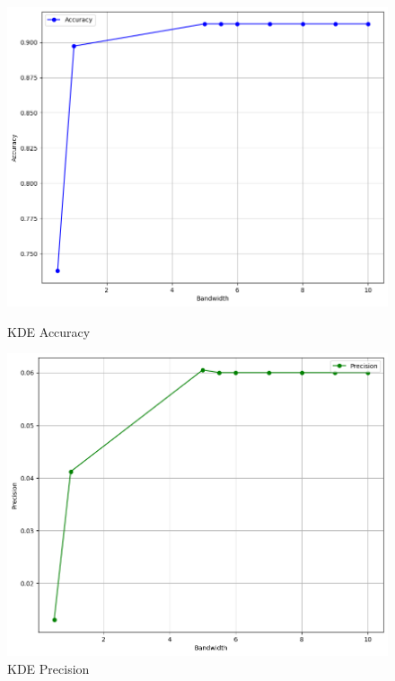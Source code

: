 \begin{figure}[p] %
    \begin{minipage}[t]{0.5\textwidth}
        \vspace{0pt}
        \includegraphics[width=\textwidth]{images/kde-accuracy.png}
        \caption{KDE Accuracy}
    \end{minipage}
    \hfill
    \begin{minipage}[t]{0.5\textwidth}
        \vspace{0pt}
        \includegraphics[width=\textwidth]{images/kde-precision.png}
        \caption{KDE Precision}

\end{minipage}
\end{figure}
